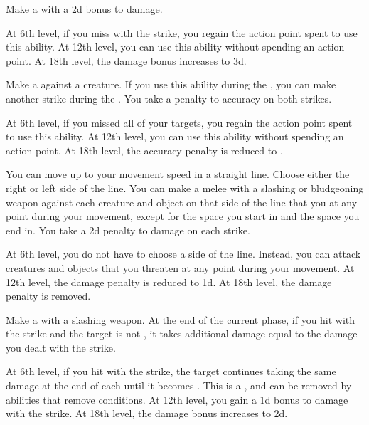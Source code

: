 {             Make a  with a \plus2d bonus to damage.
            \par At 6th level, if you miss with the strike, you regain the action point spent to use this ability.
            At 12th level, you can use this ability without spending an action point.
            At 18th level, the damage bonus increases to \plus3d.

             Make a  against a creature.
            If you use this ability during the , you can make another strike during the .
            You take a  penalty to accuracy on both strikes.
            \par At 6th level, if you missed all of your targets, you regain the action point spent to use this ability.
            At 12th level, you can use this ability without spending an action point.
            At 18th level, the accuracy penalty is reduced to .

             You can move up to your movement speed in a straight line.
            Choose either the right or left side of the line.
            You can make a melee  with a slashing or bludgeoning weapon against each creature and object on that side of the line that you  at any point during your movement, except for the space you start in and the space you end in.
            You take a \minus2d penalty to damage on each strike.
            \par At 6th level, you do not have to choose a side of the line.
            Instead, you can attack creatures and objects that you threaten at any point during your movement.
            At 12th level, the damage penalty is reduced to \minus1d.
            At 18th level, the damage penalty is removed.

             Make a  with a slashing weapon.
            At the end of the current phase, if you hit with the strike and the target is not , it takes additional damage equal to the damage you dealt with the strike.
            \par At 6th level, if you hit with the strike, the target continues taking the same damage at the end of each  until it becomes .
            This is a , and can be removed by abilities that remove conditions.
            At 12th level, you gain a \plus1d bonus to damage with the strike.
            At 18th level, the damage bonus increases to \plus2d.

}
